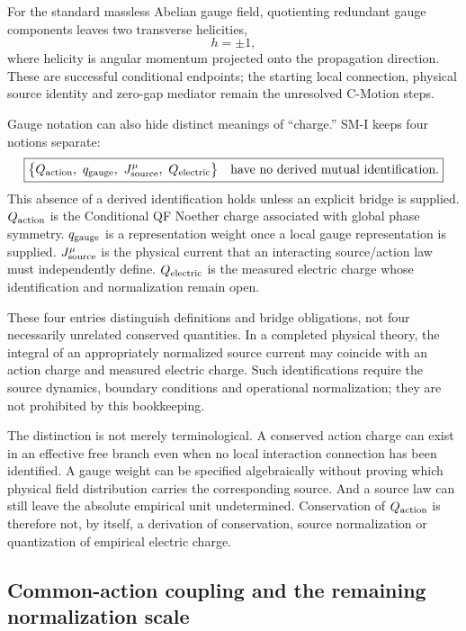 \documentclass[11pt]{article}
\theoremstyle{definition}
\begin{document}
For the standard massless Abelian gauge field, quotienting redundant gauge components leaves two transverse helicities,
\begin{equation}
 h=\pm1,
 \label{eq:helicity_control}
\end{equation}
where helicity is angular momentum projected onto the propagation direction.  These are successful conditional endpoints; the starting local connection, physical source identity and zero-gap mediator remain the unresolved C-Motion steps.


Gauge notation can also hide distinct meanings of ``charge.''
SM-I keeps four notions separate:
\begin{equation}
	\boxed{\bigl\{Q_{\rm action},\ q_{\rm gauge},\
		J^\mu_{\rm source},\ Q_{\rm electric}\bigr\}
		\quad\text{have no derived mutual identification}.}
	\label{eq:charge_distinctions}
\end{equation}
This absence of a derived identification holds unless an explicit
bridge is supplied.  $Q_{\rm action}$ is the Conditional QF Noether
charge associated with global phase symmetry.  $q_{\rm gauge}$ is
a representation weight once a local gauge representation is supplied.
$J^\mu_{\rm source}$ is the physical current that an interacting
source/action law must independently define.  $Q_{\rm electric}$ is
the measured electric charge whose identification and normalization
remain open.

These four entries distinguish definitions and bridge obligations, not four
necessarily unrelated conserved quantities.  In a completed physical theory,
the integral of an appropriately normalized source current may coincide with
an action charge and measured electric charge.  Such identifications require
the source dynamics, boundary conditions and operational normalization; they
are not prohibited by this bookkeeping.

The distinction is not merely terminological.  A conserved action charge can exist in an effective free branch even when no local interaction connection has been identified.  A gauge weight can be specified algebraically without proving which physical field distribution carries the corresponding source.  And a source law can still leave the absolute empirical unit undetermined.  Conservation of $Q_{\rm action}$ is therefore not, by itself, a derivation of conservation, source normalization or quantization of empirical electric charge.

\subsection{Common-action coupling and the remaining normalization scale}
\label{sec:common_action_coupling}
\end{document}
